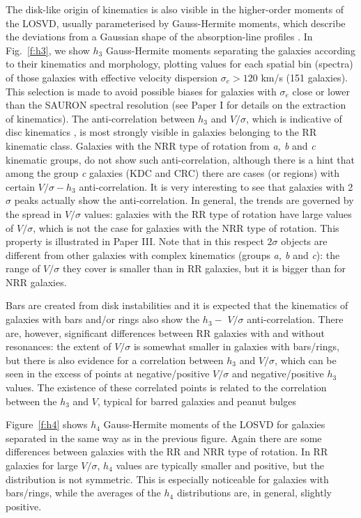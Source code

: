 \documentclass[usenatbib,usegraphicx]{mn2e}
\begin{document}
The disk-like origin of kinematics is also visible in the higher-order moments of the LOSVD, usually parameterised by Gauss-Hermite moments, which describe the deviations from a Gaussian shape of the absorption-line profiles \citep{1993ApJ...407..525V,1993MNRAS.265..213G}. In Fig.~\ref{f:h3}, we show $h_3$ Gauss-Hermite moments separating the galaxies according to their kinematics and morphology, plotting values for each spatial bin (spectra) of those galaxies with effective velocity dispersion $\sigma_e>120$ km/s (151 galaxies). This selection is made to avoid possible biases for galaxies with $\sigma_e$ close or lower than the SAURON spectral resolution (see Paper I for details on the extraction of kinematics). The anti-correlation between $h_3$ and $V/\sigma$, which is indicative of disc kinematics \citep[e.g.][]{1994MNRAS.269..785B}, is most strongly visible in galaxies belonging to the RR kinematic class. Galaxies with the NRR type of rotation from {\it a, b} and {\it c} kinematic groups, do not show such anti-correlation, although there is a hint that among the group {\it c} galaxies (KDC and CRC) there are cases (or regions) with certain $V/\sigma - h_3$ anti-correlation. It is very interesting to see that galaxies with 2$\sigma$ peaks actually show the anti-correlation. In general, the trends are governed by the spread in $V/\sigma$ values: galaxies with the RR type of rotation have large values of $V/\sigma$, which is not the case for galaxies with the NRR type of rotation. This property is illustrated in Paper III. Note that in this respect $2\sigma$ objects are different from other galaxies with complex kinematics (groups {\it a, b} and {\it c}): the range of  $V/\sigma$ they cover is smaller than in RR galaxies, but it is bigger than for NRR galaxies. 

Bars are created from disk instabilities and it is expected that the kinematics of galaxies with bars and/or rings also show the $h_3 -$ $V/\sigma$ anti-correlation. There are, however, significant differences between RR galaxies with and without resonances: the extent of $V/\sigma$ is somewhat smaller in galaxies with bars/rings, but there is also evidence for a correlation between $h_3$ and $V/\sigma$, which can be seen in the excess of points at negative/positive $V/\sigma$ and negative/positive $h_3$ values. The existence of these correlated points is related to the correlation between the $h_3$ and $V$, typical for barred galaxies and peanut bulges \citep{2004AJ....127.3192C,2005ApJ...626..159B}

Figure~\ref{f:h4} shows $h_4$ Gauss-Hermite moments of the LOSVD for galaxies separated in the same way as in the previous figure. Again there are some differences between galaxies with the RR and NRR type of rotation. In RR galaxies for large $V/\sigma$, $h_4$ values are typically smaller and positive, but the distribution is not symmetric. This is especially noticeable for galaxies with bars/rings, while the averages of the $h_4$ distributions are, in general, slightly positive. 
\end{document}
